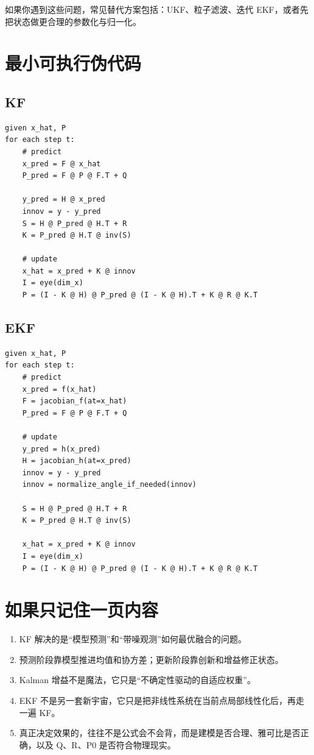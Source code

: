 \documentclass[12pt,a4paper]{ctexart}
\begin{document}
如果你遇到这些问题，常见替代方案包括：UKF、粒子滤波、迭代 EKF，或者先把状态做更合理的参数化与归一化。

\section{最小可执行伪代码}

\subsection{KF}

\begin{verbatim}
given x_hat, P
for each step t:
    # predict
    x_pred = F @ x_hat
    P_pred = F @ P @ F.T + Q

    y_pred = H @ x_pred
    innov = y - y_pred
    S = H @ P_pred @ H.T + R
    K = P_pred @ H.T @ inv(S)

    # update
    x_hat = x_pred + K @ innov
    I = eye(dim_x)
    P = (I - K @ H) @ P_pred @ (I - K @ H).T + K @ R @ K.T
\end{verbatim}

\subsection{EKF}

\begin{verbatim}
given x_hat, P
for each step t:
    # predict
    x_pred = f(x_hat)
    F = jacobian_f(at=x_hat)
    P_pred = F @ P @ F.T + Q

    # update
    y_pred = h(x_pred)
    H = jacobian_h(at=x_pred)
    innov = y - y_pred
    innov = normalize_angle_if_needed(innov)

    S = H @ P_pred @ H.T + R
    K = P_pred @ H.T @ inv(S)

    x_hat = x_pred + K @ innov
    I = eye(dim_x)
    P = (I - K @ H) @ P_pred @ (I - K @ H).T + K @ R @ K.T
\end{verbatim}

\section{如果只记住一页内容}

\begin{enumerate}
  \item KF 解决的是“模型预测”和“带噪观测”如何最优融合的问题。
  \item 预测阶段靠模型推进均值和协方差；更新阶段靠创新和增益修正状态。
  \item Kalman 增益不是魔法，它只是“不确定性驱动的自适应权重”。
  \item EKF 不是另一套新宇宙，它只是把非线性系统在当前点局部线性化后，再走一遍 KF。
  \item 真正决定效果的，往往不是公式会不会背，而是建模是否合理、雅可比是否正确，以及 Q、R、P0 是否符合物理现实。
\end{enumerate}
\end{document}
